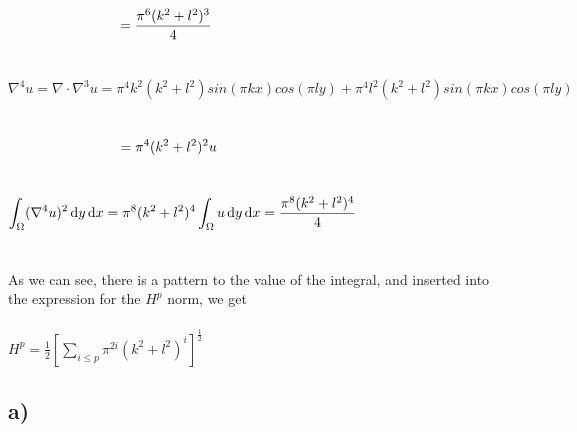 \documentclass[a4paper,english,12pt,twoside]{article}
\newcommand{\tab}{\hspace*{2em}}
\begin{document}
\\
\\
$\displaystyle \tab\tab\tab\tab = \frac{\pi^6(k^2 + l^2)^3}{4}$\\
\\
\\
$\nabla^4 u = \nabla\cdot\nabla^3u = \pi^4 k^2 (k^2 + l^2) sin(\pi k x)cos(\pi l y)  + \pi^4 l^2 (k^2 + l^2) sin(\pi k x)cos(\pi l y)$\\
\\
\\
$\displaystyle \tab\tab\tab\tab =\pi^4(k^2 + l^2)^2u$\\
\\
\\
$\displaystyle \int_{\Omega}(\nabla^4 u)^2 \mathop{}\!\mathrm{d} y \mathop{}\!\mathrm{d} x = \pi^8(k^2 + l^2)^4\int_{\Omega}u \mathop{}\!\mathrm{d} y \mathop{}\!\mathrm{d} x = \frac{ \pi^8(k^2 + l^2)^4}{4}$\\
\\
\\
As we can see, there is a pattern to the value of the integral, and inserted into the expression for the $H^p$ norm, we get\\
\\
$\displaystyle H^p = \frac{1}{2}\left[\sum_{i\leq p}\pi^{2i}(k^2 + l^2)^i\right]^\frac{1}{2}$\\

\newpage

\subsection*{a)}
\end{document}
